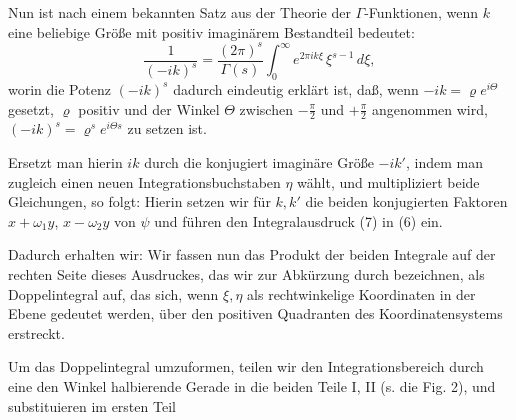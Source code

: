 Nun ist nach einem bekannten Satz aus der Theorie der
$\Gamma$-Funktionen, wenn $k$ eine beliebige Größe mit positiv imaginärem
 Bestandteil bedeutet:
\[ \frac{1}{(-ik)^s} = \frac{(2\pi)^s}{\Gamma(s)}\int_0^\infty e^{2\pi ik\xi}\,\xi^{s-1}\,d\xi, \]
worin die Potenz $(-ik)^s$ dadurch eindeutig erklärt ist, daß, wenn
$-ik = \varrho e^{i\Theta}$ gesetzt, $\varrho$ positiv und der Winkel $\Theta$ zwischen $-\frac{\pi}{2}$
und $+\frac{\pi}{2}$ angenommen wird, $(-ik)^s = \varrho^s e^{i\Theta s}$ zu setzen ist.

Ersetzt man hierin $ik$ durch die konjugiert imaginäre
Größe $-ik'$, indem man zugleich einen neuen Integrationsbuchstaben
 $\eta$ wählt, und multipliziert beide Gleichungen, so folgt:
Hierin setzen wir für $k, k'$ die beiden konjugierten Faktoren
$x+\omega_1y$, $x-\omega_2y$ von $\psi$ und führen den Integralausdruck (7)
in (6) ein.

Dadurch erhalten wir:
Wir fassen nun das Produkt der beiden Integrale auf der
rechten Seite dieses Ausdruckes, das wir zur Abkürzung durch
bezeichnen, als Doppelintegral auf, das sich, wenn $\xi, \eta$ als rechtwinkelige
 Koordinaten in der Ebene gedeutet werden, über den positiven
Quadranten des Koordinatensystems erstreckt.


Um das Doppelintegral umzuformen, teilen wir den Integrationsbereich
 durch eine den Winkel halbierende Gerade in die beiden
Teile I, II (s. die Fig. 2), und substituieren im ersten Teil
